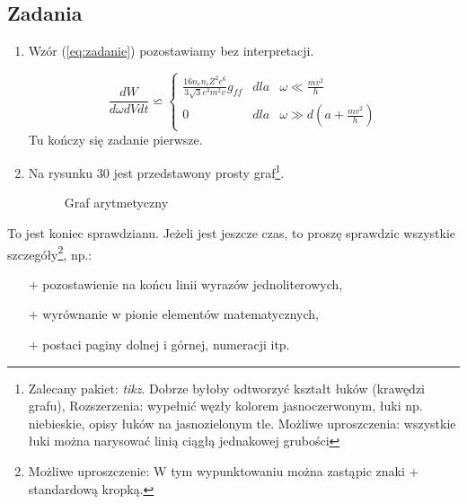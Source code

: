 \documentclass[a4paper, 11pt]{article}
\begin{document}
\subsection{Zadania}
\begin{enumerate}
\item Wzór (\ref{eq:zadanie}) pozostawiamy bez interpretacji.

\begin{equation}
\label{eq:zadanie}
\frac{dW}{d\omega dVdt} \backsimeq \left\{
\begin{array}{rcl}
\frac{16n_en_iZ^2e^6}{3\sqrt{3}c^3m^2v}g_{ff} & dla &\omega \ll \frac{mv^2}{h} \\
0 & dla & \omega \gg d(a+\frac{mv^2}{h})
\end{array}
\end{equation}
Tu kończy się zadanie pierwsze.

\item
Na rysunku 30 jest przedstawony prosty graf\footnote{Zalecany pakiet: {\em tikz}. Dobrze byłoby odtworzyć kształt łuków (krawędzi grafu), Rozszerzenia: wypełnić węzły kolorem jasnoczerwonym, łuki np. niebieskie, opisy łuków na jasnozielonym tle. Możliwe uproszczenia: wszystkie łuki można narysować linią ciągłą jednakowej grubości}.

\begin{figure}[!ht]
\caption{Graf arytmetyczny}
\label{fig:graf}
\begin{center}
\end{center}
\end{figure}
\end{enumerate}

To jest koniec sprawdzianu. Jeżeli jest jeszcze czas, to proszę sprawdzic wszystkie szczegóły\footnote{Możliwe uproszczenie: W tym wypunktowaniu można zastąpic znaki $+$ standardową kropką.}, np.:
\begin{itemize}
\item[$+$] pozostawienie na końcu linii wyrazów jednoliterowych,
\item[$+$] wyrównanie w pionie elementów matematycznych,
\item[$+$] postaci paginy dolnej i górnej, numeracji itp.
\end{itemize}
\end{document}
